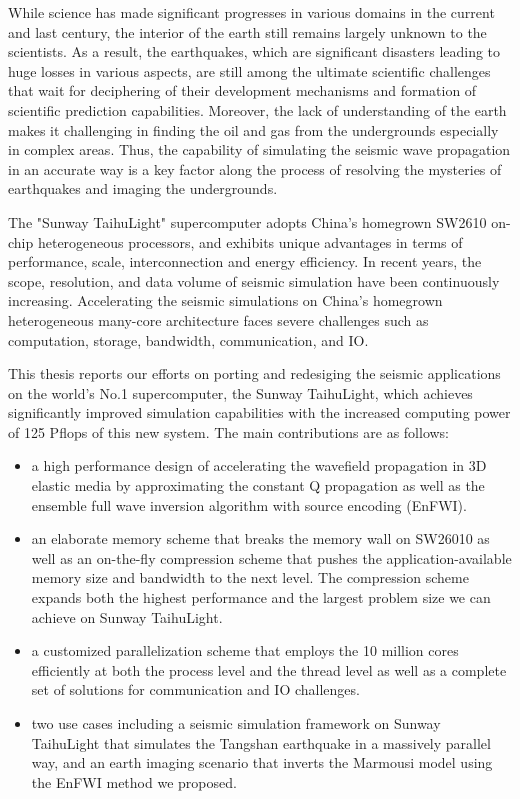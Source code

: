 \begin{eabstract}
  While science has made significant progresses in various domains in the current and last century, the interior of the earth still remains largely unknown to the scientists. As a result, the earthquakes, which are significant disasters leading to huge losses in various aspects, are still among the ultimate scientific challenges that wait for deciphering of their development mechanisms and formation of scientific prediction capabilities. Moreover, the lack of understanding of the earth makes it challenging in finding the oil and gas from the undergrounds especially in complex areas.  Thus, the capability of simulating the seismic wave propagation in an accurate way is a key factor along the process of resolving the mysteries of earthquakes and imaging the undergrounds. 

  The "Sunway TaihuLight" supercomputer adopts China's homegrown SW2610 on-chip heterogeneous processors, and exhibits unique advantages in terms of performance, scale, interconnection and energy efficiency. In recent years, the scope, resolution, and data volume of seismic simulation have been continuously increasing. Accelerating the seismic simulations on China's homegrown heterogeneous many-core architecture faces severe challenges such as computation, storage, bandwidth, communication, and IO. 

  This thesis reports our efforts on porting and redesiging the seismic applications on the world's No.1 supercomputer, the Sunway TaihuLight, which achieves significantly improved simulation capabilities with the increased computing power of 125 Pflops of this new system. The main contributions are as follows:

\begin{itemize}
  \item a high performance design of accelerating the wavefield propagation in 3D elastic media by approximating the constant Q propagation as well as the ensemble full wave inversion algorithm with source encoding (EnFWI). 

  \item an elaborate memory scheme that breaks the memory wall on SW26010 as well as an on-the-fly compression scheme that pushes the application-available memory size and bandwidth to the next level. The compression scheme expands both the highest performance and the largest problem size we can achieve on Sunway TaihuLight.

  \item a customized parallelization scheme that employs the 10 million cores efficiently at both the process level and the thread level as well as a complete set of solutions for communication and IO challenges.

  \item two use cases including a seismic simulation framework on Sunway TaihuLight that simulates the Tangshan earthquake in a massively parallel way, and an earth imaging scenario that inverts the Marmousi model using the EnFWI method we proposed. 

\end{itemize}

\end{eabstract}

